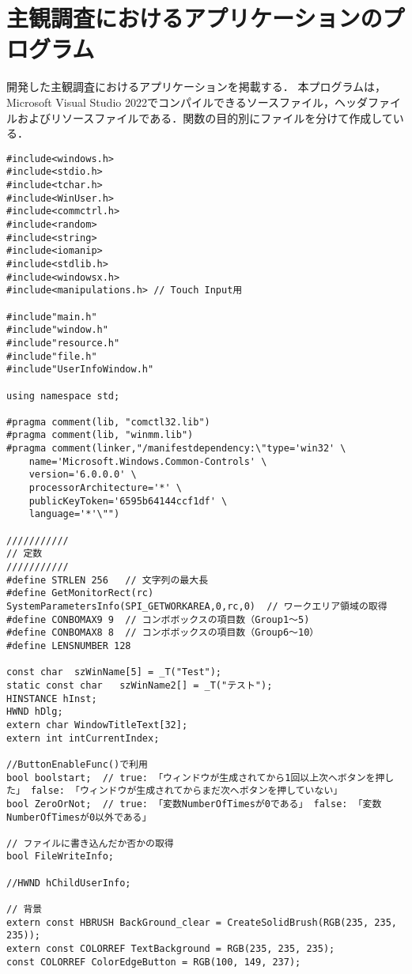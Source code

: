 \chapter{主観調査におけるアプリケーションのプログラム}
開発した主観調査におけるアプリケーションを掲載する．
本プログラムは，Microsoft Visual Studio 2022でコンパイルできるソースファイル，ヘッダファイルおよびリソースファイルである．関数の目的別にファイルを分けて作成している．

\begin{lstlisting}[caption=main.cpp]
#include<windows.h>
#include<stdio.h>
#include<tchar.h>
#include<WinUser.h>
#include<commctrl.h> 
#include<random>
#include<string>
#include<iomanip>
#include<stdlib.h>
#include<windowsx.h>
#include<manipulations.h> // Touch Input用

#include"main.h"
#include"window.h"
#include"resource.h"
#include"file.h"
#include"UserInfoWindow.h"

using namespace std;

#pragma comment(lib, "comctl32.lib")
#pragma comment(lib, "winmm.lib")
#pragma comment(linker,"/manifestdependency:\"type='win32' \
	name='Microsoft.Windows.Common-Controls' \
	version='6.0.0.0' \
	processorArchitecture='*' \
	publicKeyToken='6595b64144ccf1df' \
	language='*'\"") 

///////////
// 定数
///////////
#define STRLEN 256   // 文字列の最大長
#define GetMonitorRect(rc)  SystemParametersInfo(SPI_GETWORKAREA,0,rc,0)  // ワークエリア領域の取得
#define CONBOMAX9 9  // コンボボックスの項目数（Group1～5)
#define CONBOMAX8 8  // コンボボックスの項目数（Group6～10）
#define LENSNUMBER 128

const char	szWinName[5] = _T("Test");
static const char   szWinName2[] = _T("テスト");
HINSTANCE hInst;
HWND hDlg;
extern char WindowTitleText[32];
extern int intCurrentIndex;

//ButtonEnableFunc()で利用
bool boolstart;  // true: 「ウィンドウが生成されてから1回以上次へボタンを押した」 false: 「ウィンドウが生成されてからまだ次へボタンを押していない」
bool ZeroOrNot;  // true: 「変数NumberOfTimesが0である」 false: 「変数NumberOfTimesが0以外である」

// ファイルに書き込んだか否かの取得
bool FileWriteInfo;

//HWND hChildUserInfo;

// 背景
extern const HBRUSH BackGround_clear = CreateSolidBrush(RGB(235, 235, 235));
extern const COLORREF TextBackground = RGB(235, 235, 235);
const COLORREF ColorEdgeButton = RGB(100, 149, 237);


\end{lstlisting}
